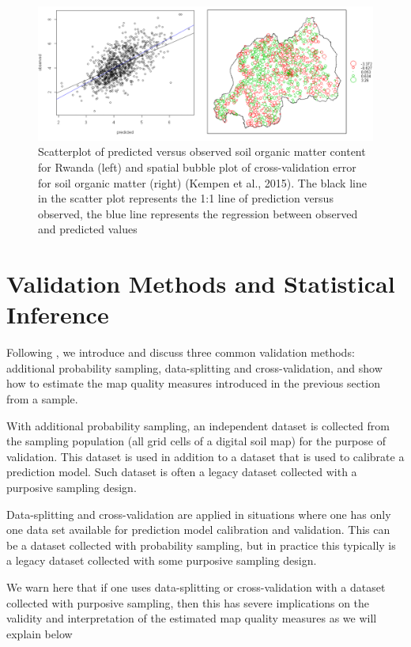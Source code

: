 \documentclass[10pt,b5paper,]{book}
\theoremstyle{definition}
\theoremstyle{definition}
\theoremstyle{definition}
\theoremstyle{remark}
\begin{document}
\begin{figure}
\includegraphics[width=0.8\linewidth]{images/Validation_Rwanda} \caption{Scatterplot of predicted versus observed soil organic matter content for Rwanda (left) and spatial bubble plot of cross-validation error for soil organic matter (right) (Kempen et al., 2015). The black line in the scatter plot represents the 1:1 line of prediction versus observed, the blue line represents the regression between observed and predicted values}\label{fig:rwandaval}
\end{figure}

\hypertarget{validation-methods-and-statistical-inference}{%
\section{Validation Methods and Statistical
Inference}\label{validation-methods-and-statistical-inference}}

Following \citet{brus2011sampling}, we introduce and discuss three
common validation methods: additional probability sampling,
data-splitting and cross-validation, and show how to estimate the map
quality measures introduced in the previous section from a sample.

With additional probability sampling, an independent dataset is
collected from the sampling population (all grid cells of a digital soil
map) for the purpose of validation. This dataset is used in addition to
a dataset that is used to calibrate a prediction model. Such dataset is
often a legacy dataset collected with a purposive sampling design.

Data-splitting and cross-validation are applied in situations where one
has only one data set available for prediction model calibration and
validation. This can be a dataset collected with probability sampling,
but in practice this typically is a legacy dataset collected with some
purposive sampling design.

We warn here that if one uses data-splitting or cross-validation with a
dataset collected with purposive sampling, then this has severe
implications on the validity and interpretation of the estimated map
quality measures as we will explain below
\end{document}
